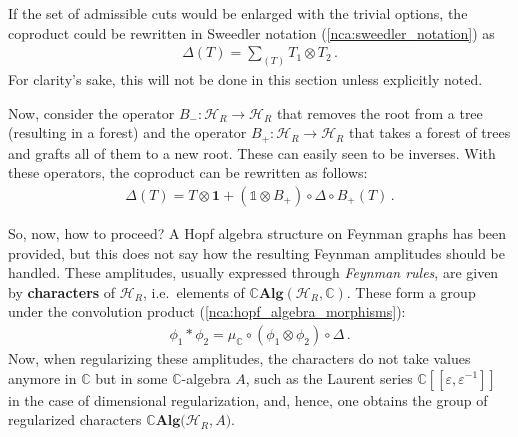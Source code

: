     \begin{remark}\label{qft:sweedler_notation}
        If the set of admissible cuts would be enlarged with the trivial options, the coproduct could be rewritten in Sweedler notation (\cref{nca:sweedler_notation}) as
        \begin{gather}
            \Delta(T) = \sum_{(T)}T_1\otimes T_2\,.
        \end{gather}
        For clarity's sake, this will not be done in this section unless explicitly noted.
    \end{remark}

    Now, consider the operator $B_-:\mathcal{H}_R\rightarrow\mathcal{H}_R$ that removes the root from a tree (resulting in a forest) and the operator $B_+:\mathcal{H}_R\rightarrow\mathcal{H}_R$ that takes a forest of trees and grafts all of them to a new root. These can easily seen to be inverses. With these operators, the coproduct can be rewritten as follows:
    \begin{gather}
        \Delta(T) = T\otimes\mathbf{1} + (\mathbb{1}\otimes B_+)\circ\Delta\circ B_+(T)\,.
    \end{gather}

    So, now, how to proceed? A Hopf algebra structure on Feynman graphs has been provided, but this does not say how the resulting Feynman amplitudes should be handled. These amplitudes, usually expressed through \textit{Feynman rules}, are given by \textbf{characters} of $\mathcal{H}_R$, i.e.~elements of $\mathbb{C}\mathbf{Alg}(\mathcal{H}_R,\mathbb{C})$. These form a group under the convolution product (\cref{nca:hopf_algebra_morphisms}):
    \begin{gather}
        \phi_1\ast\phi_2 = \mu_{\mathbb{C}}\circ(\phi_1\otimes\phi_2)\circ\Delta\,.
    \end{gather}
    Now, when regularizing these amplitudes, the characters do not take values anymore in $\mathbb{C}$ but in some $\mathbb{C}$-algebra $A$, such as the Laurent series $\mathbb{C}[[\varepsilon,\varepsilon^{-1}]]$ in the case of dimensional regularization, and, hence, one obtains the group of regularized characters $\mathbb{C}\mathbf{Alg}\bigl(\mathcal{H}_R,A\bigr)$.

